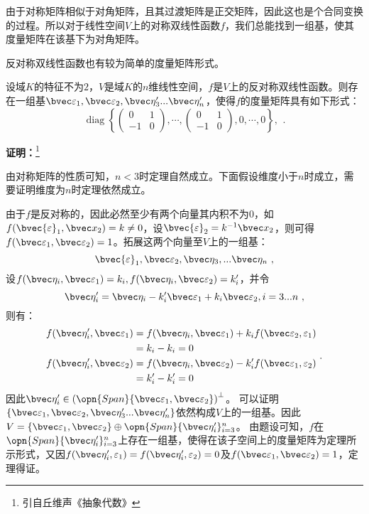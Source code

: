 由于对称矩阵相似于对角矩阵，且其过渡矩阵是正交矩阵，因此这也是个合同变换的过程。所以对于线性空间$V$上的对称双线性函数$f$，我们总能找到一组基，使其度量矩阵在该基下为对角矩阵。

反对称双线性函数也有较为简单的度量矩阵形式。
\begin{theorem}{}
设域$K$的特征不为$2$，$V$是域$K$的$n$维线性空间，$f$是$V$上的反对称双线性函数。则存在一组基$\bvec \varepsilon_1,\bvec \varepsilon_2,\bvec \eta'_3...\bvec \eta'_n$，使得$f$的度量矩阵具有如下形式：
\begin{equation}
\operatorname{diag}\left\{\left(\begin{array}{rr}
0 & 1 \\
-1 & 0
\end{array}\right), \cdots,\left(\begin{array}{rr}
0 & 1 \\
-1 & 0
\end{array}\right), 0, \cdots, 0\right\} \text {, }
~.\end{equation}
\end{theorem}
\textbf{证明：}\footnote{引自丘维声《抽象代数》}

由对称矩阵的性质可知，$n< 3$时定理自然成立。下面假设维度小于$n$时成立，需要证明维度为$n$时定理依然成立。

由于$f$是反对称的，因此必然至少有两个向量其内积不为$0$，如$f(\bvec {\varepsilon}_1,\bvec x_2)=k\neq 0$，设$\bvec {\varepsilon}_2=k^{-1}\bvec x_2$，则可得$f(\bvec\varepsilon_1,\bvec\varepsilon_2)=1$。拓展这两个向量至$V$上的一组基：
\begin{equation}
\bvec {\varepsilon}_1,\bvec \varepsilon_2,\bvec\eta_3,...\bvec\eta_n~,
\end{equation}
设$f(\bvec \eta_i,\bvec\varepsilon_1)=k_i,f(\bvec \eta_i,\bvec\varepsilon_2)=k'_i$，并令
\begin{equation}
\bvec\eta'_i=\bvec \eta_i-k'_i\bvec\varepsilon_1+k_i\bvec\varepsilon_2,i=3...n~,
\end{equation}
则有：
\begin{equation}
\begin{aligned}
f(\bvec \eta'_i,\bvec\varepsilon_1)&=f(\bvec\eta_i,\bvec\varepsilon_1)+k_if(\bvec\varepsilon_2,\varepsilon_1)\\
&=k_i-k_i=0\\
f(\bvec \eta'_i,\bvec\varepsilon_2)&=f(\bvec\eta_i,\bvec\varepsilon_2)-k'_if(\bvec\varepsilon_1,\varepsilon_2)\\
&=k'_i-k'_i=0
\end{aligned}~.
\end{equation}
因此$\bvec \eta'_i\in \left(\opn{Span}\{\bvec\varepsilon_1,\bvec\varepsilon_2\}\right)^{\bot}$。
可以证明$\{\bvec\varepsilon_1,\bvec\varepsilon_2,\bvec\eta'_3...\bvec\eta'_n\}$依然构成$V$上的一组基。因此$V=\{\bvec\varepsilon_1,\bvec\varepsilon_2\}\oplus \opn{Span}\{\bvec\eta'_i\}_{i=3}^n$。
由题设可知，$f$在$ \opn{Span}\{\bvec\eta'_i\}_{i=3}^n$上存在一组基，使得在该子空间上的度量矩阵为定理所示形式，又因$f(\bvec \eta'_i,\varepsilon_1)=f(\bvec \eta'_i,\varepsilon_2)=0$及$f(\bvec\varepsilon_1,
\bvec\varepsilon_2)=1$，定理得证。
